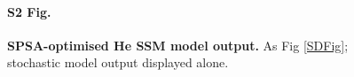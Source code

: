 \documentclass{ut-thesis}
\begin{document}
\begin{NoHyper}
\begin{figure}[p]
\paragraph{S2 Fig.}
\label{stochasticSupplement}
{\bf SPSA-optimised He SSM model output.} As Fig \ref{SDFig}; stochastic model output displayed alone.
\end{figure}


\end{NoHyper}
\end{document}
